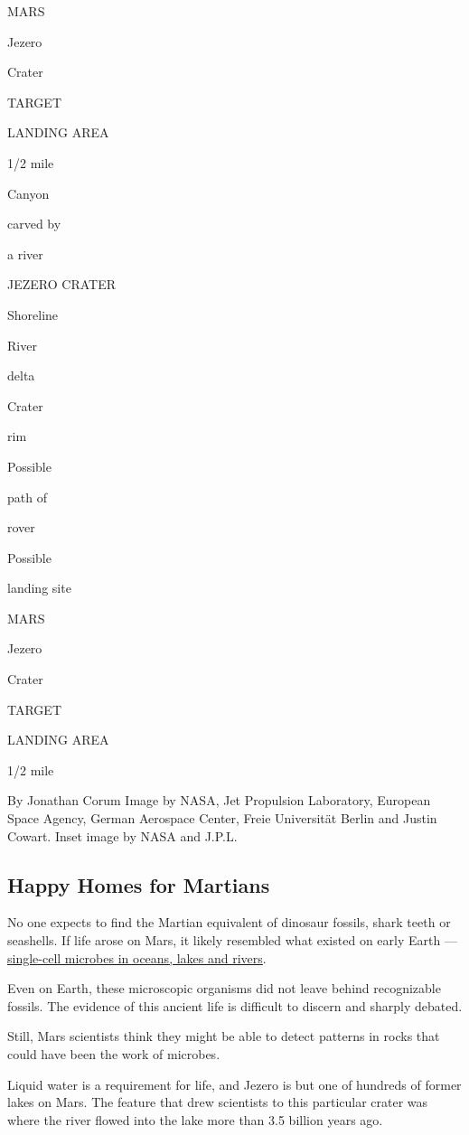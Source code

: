 MARS

Jezero

Crater

TARGET

LANDING AREA

1/2 mile

Canyon

carved by

a river

JEZERO CRATER

Shoreline

River

delta

Crater

rim

Possible

path of

rover

Possible

landing site

MARS

Jezero

Crater

TARGET

LANDING AREA

1/2 mile

By Jonathan Corum \textbar{} Image by NASA, Jet Propulsion Laboratory,
European Space Agency, German Aerospace Center, Freie Universität Berlin
and Justin Cowart. Inset image by NASA and J.P.L.

\hypertarget{happy-homes-for-martians}{%
\subsection{Happy Homes for Martians}\label{happy-homes-for-martians}}

No one expects to find the Martian equivalent of dinosaur fossils, shark
teeth or seashells. If life arose on Mars, it likely resembled what
existed on early Earth ---
\href{https://www.nytimes3xbfgragh.onion/2020/07/24/science/mars-life-water.html}{single-cell
microbes in oceans, lakes and rivers}.

Even on Earth, these microscopic organisms did not leave behind
recognizable fossils. The evidence of this ancient life is difficult to
discern and sharply debated.

Still, Mars scientists think they might be able to detect patterns in
rocks that could have been the work of microbes.

Liquid water is a requirement for life, and Jezero is but one of
hundreds of former lakes on Mars. The feature that drew scientists to
this particular crater was where the river flowed into the lake more
than 3.5 billion years ago.

